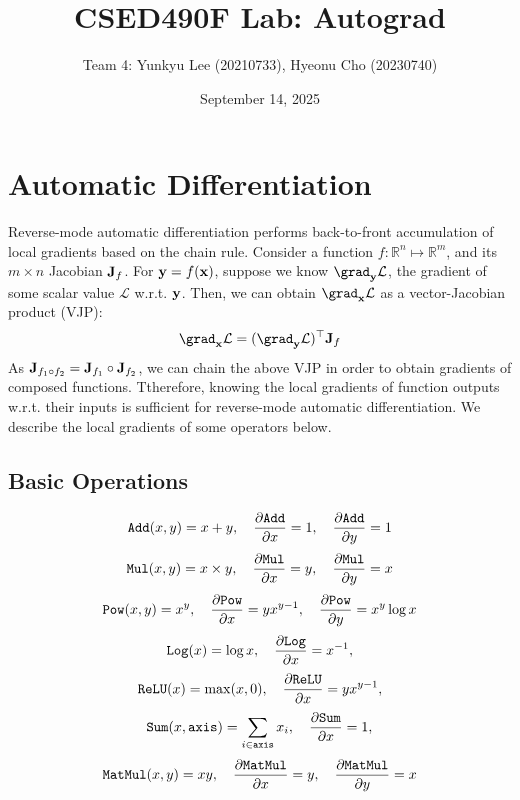 \documentclass{lucas-report}
\title{CSED490F Lab: Autograd}
\author{Team 4: Yunkyu Lee (20210733), Hyeonu Cho (20230740)}
\date{September 14, 2025}
\begin{document}
\maketitle

\section{Automatic Differentiation}\label{sec:autodiff}

Reverse-mode automatic differentiation performs
back-to-front accumulation of local gradients based on the chain rule.
Consider a function $f : \mathbb{R}^{n} \mapsto \mathbb{R}^m$,
and its $m \times n$ Jacobian $\mathbf{J}_f$.
For $\mathbf{y} = f(\mathbf{x})$, suppose we know $\grad_{\vb{y}}\mathcal{L}$,
the gradient of some scalar value $\mathcal{L}$ w.r.t. $\mathbf{y}$.
Then, we can obtain $\grad_{\vb{x}}\mathcal{L}$ as a vector-Jacobian product (VJP):
\[
  \grad_{\vb{x}}\mathcal{L} = (\grad_{\vb{y}}\mathcal{L})^\top \vb{J}_f
\]
As $\mathbf{J}_{f_1 \circ f_2} = \mathbf{J}_{f_1} \circ \mathbf{J}_{f_2}$,
we can chain the above VJP in order to obtain gradients of composed functions.
Ttherefore, knowing the local gradients of function outputs w.r.t. their inputs
is sufficient for reverse-mode automatic differentiation.
We describe the local gradients of some operators below.

\subsection{Basic Operations}

\begin{equation}
  \texttt{Add}(x, y) = x + y,
  \quad \pdv{\texttt{Add}}{x} = 1,
  \quad \pdv{\texttt{Add}}{y} = 1
\end{equation}
\begin{equation}
  \texttt{Mul}(x, y) = x \times y,
  \quad \pdv{\texttt{Mul}}{x} = y,
  \quad \pdv{\texttt{Mul}}{y} = x
\end{equation}
\begin{equation}
  \texttt{Pow}(x, y) = x^y,
  \quad \pdv{\texttt{Pow}}{x} = yx^{y-1},
  \quad \pdv{\texttt{Pow}}{y} = x^y \log x
\end{equation}
\begin{equation}
  \texttt{Log}(x) = \log x,
  \quad \pdv{\texttt{Log}}{x} = x^{-1},
\end{equation}
\begin{equation}
  \texttt{ReLU}(x) = \max(x, 0),
  \quad \pdv{\texttt{ReLU}}{x} = yx^{y-1},
\end{equation}
\begin{equation}
  \texttt{Sum}(x, \texttt{axis}) = \sum_{i \in \texttt{axis}} x_i,
  \quad \pdv{\texttt{Sum}}{x} = 1,
\end{equation}
\begin{equation}
  \texttt{MatMul}(x, y) = xy,
  \quad \pdv{\texttt{MatMul}}{x} = y,
  \quad \pdv{\texttt{MatMul}}{y} = x
\end{equation}
\end{document}
